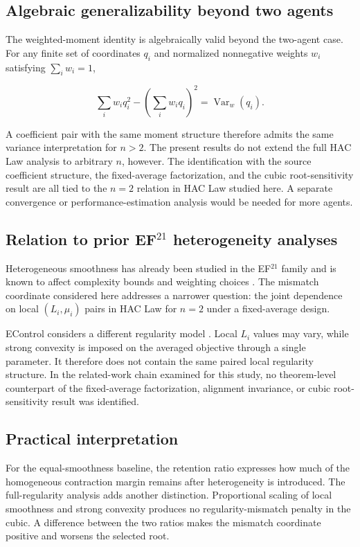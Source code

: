 \subsection{Algebraic generalizability beyond two agents}\label{sec:generalizability}

The weighted-moment identity is algebraically valid beyond the two-agent case. For any finite set of coordinates $q_i$ and normalized nonnegative weights $w_i$ satisfying $\sum_i w_i=1$,

\[
\sum_i w_iq_i^2-
\left(\sum_i w_iq_i\right)^2
=
\operatorname{Var}_w(q_i).
\]

A coefficient pair with the same moment structure therefore admits the same variance interpretation for $n>2$. The present results do not extend the full HAC Law analysis to arbitrary $n$, however. The identification with the source coefficient structure, the fixed-average factorization, and the cubic root-sensitivity result are all tied to the $n=2$ relation in HAC Law studied here. A separate convergence or performance-estimation analysis would be needed for more agents.

\subsection{Relation to prior \texorpdfstring{EF$^{21}$}{EF21} heterogeneity analyses}

Heterogeneous smoothness has already been studied in the EF$^{21}$ family and is known to affect complexity bounds and weighting choices \citep{richtarik2024reloaded}. The mismatch coordinate considered here addresses a narrower question: the joint dependence on local $(L_i,\mu_i)$ pairs in HAC Law for $n=2$ under a fixed-average design.

EControl considers a different regularity model \citep{gao2024econtrol}. Local $L_i$ values may vary, while strong convexity is imposed on the averaged objective through a single parameter. It therefore does not contain the same paired local regularity structure. In the related-work chain examined for this study, no theorem-level counterpart of the fixed-average factorization, alignment invariance, or cubic root-sensitivity result was identified.

\subsection{Practical interpretation}

For the equal-smoothness baseline, the retention ratio expresses how much of the homogeneous contraction margin remains after heterogeneity is introduced. The full-regularity analysis adds another distinction. Proportional scaling of local smoothness and strong convexity produces no regularity-mismatch penalty in the cubic. A difference between the two ratios makes the mismatch coordinate positive and worsens the selected root.

